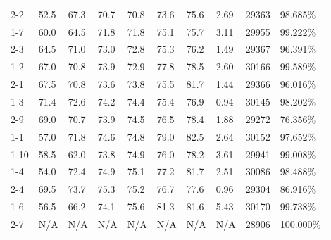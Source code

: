 \begin{table}
\begin{tabular}{@{}llllllllll@{}}
2-2  & 52.5 & 67.3 & 70.7 & 70.8 & 73.6 & 75.6 & 2.69 & \num{29363} & 98.685\%         \\
1-7  & 60.0 & 64.5 & 71.8 & 71.8 & 75.1 & 75.7 & 3.11 & \num{29955} & 99.222\%         \\
2-3  & 64.5 & 71.0 & 73.0 & 72.8 & 75.3 & 76.2 & 1.49 & \num{29367} & 96.391\%         \\
1-2  & 67.0 & 70.8 & 73.9 & 72.9 & 77.8 & 78.5 & 2.60 & \num{30166} & 99.589\%         \\
2-1  & 67.5 & 70.8 & 73.6 & 73.8 & 75.5 & 81.7 & 1.44 & \num{29366} & 96.016\%         \\
1-3  & 71.4 & 72.6 & 74.2 & 74.4 & 75.4 & 76.9 & 0.94 & \num{30145} & 98.202\%         \\
2-9  & 69.0 & 70.7 & 73.9 & 74.5 & 76.5 & 78.4 & 1.88 & \num{29272} & 76.356\%         \\
1-1  & 57.0 & 71.8 & 74.6 & 74.8 & 79.0 & 82.5 & 2.64 & \num{30152} & 97.652\%         \\
1-10 & 58.5 & 62.0 & 73.8 & 74.9 & 76.0 & 78.2 & 3.61 & \num{29941} & 99.008\%         \\
1-4  & 54.0 & 72.4 & 74.9 & 75.1 & 77.2 & 81.7 & 2.51 & \num{30086} & 98.488\%         \\
2-4  & 69.5 & 73.7 & 75.3 & 75.2 & 76.7 & 77.6 & 0.96 & \num{29304} & 86.916\%         \\
1-6  & 56.5 & 66.2 & 74.1 & 75.6 & 81.3 & 81.6 & 5.43 & \num{30170} & 99.738\%         \\
2-7  & N/A  & N/A  & N/A  & N/A  & N/A  & N/A  & N/A  & \num{28906} & 100.000\%        \\ \bottomrule
\end{tabular}
\end{table}



